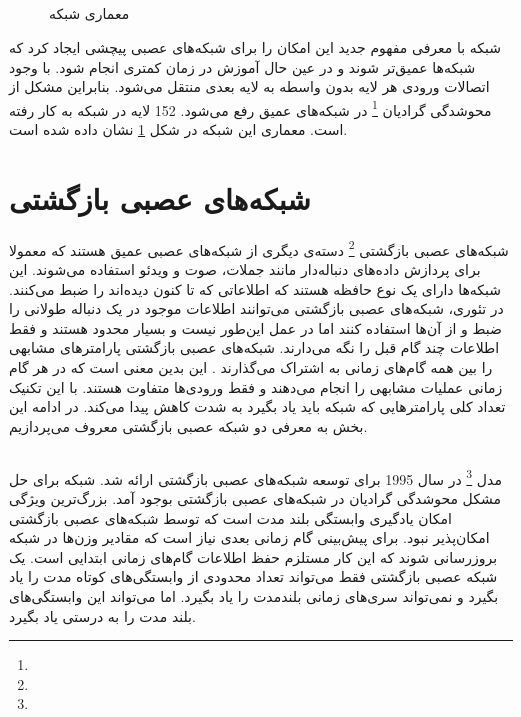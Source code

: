 \subsection{}
	\begin{figure}
		\caption[معماری شبکه ]{معماری شبکه 
			\href{https://towardsdatascience.com/illustrated-10-cnn-architectures-95d78ace614d\#e4b1}{}}
		\label{fig:ResNet}
	\end{figure}
	شبکه
	\cite{he2016deep}
	با معرفی مفهوم جدید
	این امکان را برای شبکه‌های عصبی پیچشی ایجاد کرد که شبکه‌ها عمیق‌تر شوند و در عین حال آموزش در زمان کمتری انجام شود. با وجود اتصالات 
	ورودی هر لایه بدون واسطه به لایه بعدی منتقل می‌شود. بنابراین مشکل از محوشدگی گرادیان
	\footnote{}
	 در شبکه‌های عمیق رفع می‌شود. 152 لایه در شبکه 
	به کار رفته است. معماری این شبکه در شکل 
	\ref{fig:ResNet}
	نشان داده شده است.

\section{شبکه‌های عصبی بازگشتی}
	شبکه‌های عصبی بازگشتی
	\footnote{}
	دسته‌ی دیگری از شبکه‌های عصبی عمیق هستند که معمولا برای پردازش داده‌های دنباله‌دار مانند جملات، صوت و ویدئو استفاده می‌شوند. این شبکه‌ها دارای یک نوع حافظه هستند که اطلاعاتی که تا کنون دیده‌اند را ضبط می‌کنند. در تئوری، شبکه‌های عصبی بازگشتی می‌توانند اطلاعات موجود در یک دنباله طولانی را ضبط و از آن‌ها استفاده کنند اما در عمل این‌طور نیست و بسیار محدود هستند ‌و فقط اطلاعات چند گام قبل را نگه می‌دارند. شبکه‌های عصبی بازگشتی پارامترهای مشابهی را بین همه گام‌های زمانی به اشتراک می‌گذارند . این بدین معنی است که در هر گام زمانی عملیات مشابهی را انجام می‌دهند و فقط ورودی‌ها متفاوت هستند. با این تکنیک تعداد کلی پارامتر‌هایی که شبکه باید یاد بگیرد به شدت کاهش پیدا می‌کند. در ادامه این بخش به معرفی دو شبکه عصبی بازگشتی معروف می‌پردازیم.
	
\subsection{}
	مدل 
	 \footnote{}\cite{hochreiter1997long}
	در سال 1995 برای توسعه شبکه‌های عصبی بازگشتی ارائه شد. شبکه 
	برای حل مشکل محوشدگی گرادیان در شبکه‌های عصبی بازگشتی بوجود آمد. بزرگ‌ترین ویژگی 
	 امکان یادگیری وابستگی بلند مدت است که توسط شبکه‌های عصبی بازگشتی امکان‌پذیر نبود. برای پیش‌بینی گام زمانی بعدی نیاز است که مقادیر وزن‌ها در شبکه بروزرسانی شوند که این کار مستلزم حفظ اطلاعات گام‌های زمانی ابتدایی است. یک شبکه عصبی بازگشتی فقط می‌تواند تعداد محدودی از وابستگی‌های کوتاه مدت را یاد بگیرد و نمی‌تواند سری‌های زمانی بلندمدت را یاد بگیرد. اما 
	 می‌تواند این وابستگی‌های بلند مدت را به درستی یاد بگیرد.
	 
